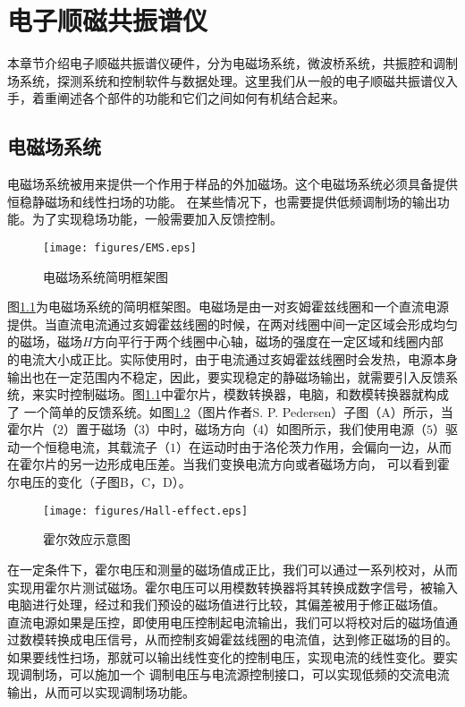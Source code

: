 
\chapter{电子顺磁共振谱仪}
本章节介绍电子顺磁共振谱仪硬件，分为电磁场系统，微波桥系统，共振腔和调制场系统，探测系统和控制软件与数据处理。这里我们从一般的电子顺磁共振谱仪入手，着重阐述各个部件的功能和它们之间如何有机结合起来。

    \section{电磁场系统}
    电磁场系统被用来提供一个作用于样品的外加磁场。这个电磁场系统必须具备提供恒稳静磁场和线性扫场的功能。 在某些情况下，也需要提供低频调制场的输出功能。为了实现稳场功能，一般需要加入反馈控制。
        \begin{figure}[htbp]
        \begin{center}
          \texttt{[image: figures/EMS.eps]}
          \caption{电磁场系统简明框架图
          }
          \label{EMS}
        \end{center}
        \end{figure}

    图\ref{EMS}为电磁场系统的简明框架图。电磁场是由一对亥姆霍兹线圈和一个直流电源提供。当直流电流通过亥姆霍兹线圈的时候，在两对线圈中间一定区域会形成均匀的磁场，磁场$H$方向平行于两个线圈中心轴，磁场的强度在一定区域和线圈内部
    的电流大小成正比。实际使用时，由于电流通过亥姆霍兹线圈时会发热，电源本身输出也在一定范围内不稳定，因此，要实现稳定的静磁场输出，就需要引入反馈系统，来实时控制磁场。图\ref{EMS}中霍尔片，模数转换器，电脑，和数模转换器就构成了
    一个简单的反馈系统。如图\ref{Hall-effect}（图片作者S. P. Pedersen）子图（A）所示，当霍尔片（$2$）置于磁场（$3$）中时，磁场方向（$4$）如图所示，我们使用电源（$5$）驱动一个恒稳电流，其载流子（$1$）在运动时由于洛伦茨力作用，会偏向一边，从而在霍尔片的另一边形成电压差。当我们变换电流方向或者磁场方向，
    可以看到霍尔电压的变化（子图B，C，D）。
        \begin{figure}[htbp]
        \begin{center}
          \texttt{[image: figures/Hall-effect.eps]}
          \caption{霍尔效应示意图
          }
          \label{Hall-effect}
        \end{center}
        \end{figure}
    在一定条件下，霍尔电压和测量的磁场值成正比，我们可以通过一系列校对，从而实现用霍尔片测试磁场。霍尔电压可以用模数转换器将其转换成数字信号，被输入电脑进行处理，经过和我们预设的磁场值进行比较，其偏差被用于修正磁场值。
    直流电源如果是压控，即使用电压控制起电流输出，我们可以将校对后的磁场值通过数模转换成电压信号，从而控制亥姆霍兹线圈的电流值，达到修正磁场的目的。如果要线性扫场，那就可以输出线性变化的控制电压，实现电流的线性变化。要实现调制场，可以施加一个
    调制电压与电流源控制接口，可以实现低频的交流电流输出，从而可以实现调制场功能。
